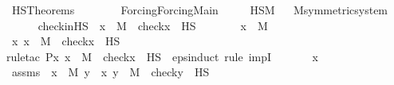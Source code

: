 %
\begin{isabellebody}%
%
%
\isadelimtheory
%
\endisadelimtheory
%
\isatagtheory
{}\isamarkupfalse%
\ HS{\isacharunderscore}{\kern0pt}Theorems\isanewline
\ \ \ \isanewline
\ \ \ \ {\isachardoublequoteopen}Forcing{\isacharslash}{\kern0pt}Forcing{\isacharunderscore}{\kern0pt}Main{\isachardoublequoteclose}\ \isanewline
\ \ \ \ HS{\isacharunderscore}{\kern0pt}M\isanewline
{}%
\endisatagtheory
{\isafoldtheory}%
%
\isadelimtheory
\ \isanewline
%
\endisadelimtheory
\isanewline
{}\isamarkupfalse%
\ M{\isacharunderscore}{\kern0pt}symmetric{\isacharunderscore}{\kern0pt}system\isanewline
{}\isanewline
\ \ \ \ \isanewline
{}\isamarkupfalse%
\ check{\isacharunderscore}{\kern0pt}in{\isacharunderscore}{\kern0pt}HS\ {\isacharcolon}{\kern0pt}\ {\isachardoublequoteopen}x\ {\isasymin}\ M\ {\isasymLongrightarrow}\ check{\isacharparenleft}{\kern0pt}x{\isacharparenright}{\kern0pt}\ {\isasymin}\ HS{\isachardoublequoteclose}\ \isanewline
%
\isadelimproof
%
\endisadelimproof
%
\isatagproof
{}\isamarkupfalse%
\ {\isacharminus}{\kern0pt}\ \isanewline
\ \ \isamarkupfalse%
\ {\isachardoublequoteopen}x\ {\isasymin}\ M{\isachardoublequoteclose}\ \isanewline
\ \ \isamarkupfalse%
\ {\isachardoublequoteopen}{\isasymAnd}x{\isachardot}{\kern0pt}\ x\ {\isasymin}\ M\ {\isasymlongrightarrow}\ check{\isacharparenleft}{\kern0pt}x{\isacharparenright}{\kern0pt}\ {\isasymin}\ HS{\isachardoublequoteclose}\ \isanewline
\ \ \isamarkupfalse%
{\isacharparenleft}{\kern0pt}rule{\isacharunderscore}{\kern0pt}tac\ P{\isacharequal}{\kern0pt}{\isachardoublequoteopen}{\isasymlambda}x{\isachardot}{\kern0pt}\ x\ {\isasymin}\ M\ {\isasymlongrightarrow}\ check{\isacharparenleft}{\kern0pt}x{\isacharparenright}{\kern0pt}\ {\isasymin}\ HS{\isachardoublequoteclose}\ \ eps{\isacharunderscore}{\kern0pt}induct{\isacharcomma}{\kern0pt}\ rule\ impI{\isacharparenright}{\kern0pt}\ \isanewline
\ \ \ \ \isamarkupfalse%
\ x\ \isamarkupfalse%
\ assms\ {\isacharcolon}{\kern0pt}\ {\isachardoublequoteopen}x\ {\isasymin}\ M{\isachardoublequoteclose}\ {\isachardoublequoteopen}{\isasymforall}y\ {\isasymin}\ x{\isachardot}{\kern0pt}\ y\ {\isasymin}\ M\ {\isasymlongrightarrow}\ check{\isacharparenleft}{\kern0pt}y{\isacharparenright}{\kern0pt}\ {\isasymin}\ HS{\isachardoublequoteclose}\isanewline
\ \ \ \ \isamarkupfalse%

\end{isabellebody}
